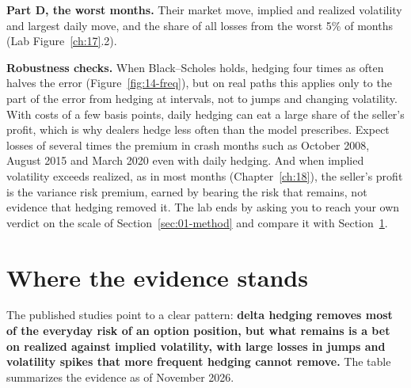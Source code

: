 \textbf{Part D, the worst months.} Their market move, implied and realized volatility and largest daily move, and the share of all losses from the worst 5\% of months (Lab Figure~\ref{ch:17}.2).

\label{sec:14-stress}
\textbf{Robustness checks.} When Black--Scholes holds, hedging four times as often halves the error (Figure~\ref{fig:14-freq}), but on real paths this applies only to the part of the error from hedging at intervals, not to jumps and changing volatility. With costs of a few basis points, daily hedging can eat a large share of the seller's profit, which is why dealers hedge less often than the model prescribes. Expect losses of several times the premium in crash months such as October 2008, August 2015 and March 2020 even with daily hedging. And when implied volatility exceeds realized, as in most months (Chapter~\ref{ch:18}), the seller's profit is the variance risk premium, earned by bearing the risk that remains, not evidence that hedging removed it. The lab ends by asking you to reach your own verdict on the scale of Section~\ref{sec:01-method} and compare it with Section~\ref{sec:14-verdict}.

\section{Where the evidence stands}
\label{sec:14-verdict}

The published studies point to a clear pattern: \textbf{delta hedging removes most of the everyday risk of an option position, but what remains is a bet on realized against implied volatility, with large losses in jumps and volatility spikes that more frequent hedging cannot remove.} The table summarizes the evidence as of November 2026.

